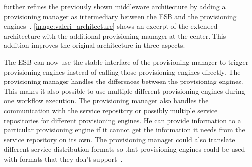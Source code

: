 \citeauthor*{provisioning:dynamic} further refines the previously shown middleware architecture by adding a provisioning manager as intermediary between the ESB and the provisioning engines~\autocite{provisioning:dynamic}.
\autoref{image:valeri_architecture} shows an excerpt of the extended architecture with the additional provisioning manager at the center.
This addition improves the original architecture in three aspects.

The ESB can now use the stable interface of the provisioning manager to trigger provisioning engines instead of calling those provisioning engines directly.
The provisioning manager handles the differences between the provisioning engines.
This makes it also possible to use multiple different provisioning engines during one workflow execution.
The provisioning manager also handles the communication with the service repository or possibly multiple service repositories for different provisioning engines.
He can provide information to a particular provisioning engine if it cannot get the information it needs from the service repository on its own.
The provisioning manager could also translate different service distribution formats so that provisioning engines could be used with formats that they don't support~\autocite{provisioning:dynamic}.
